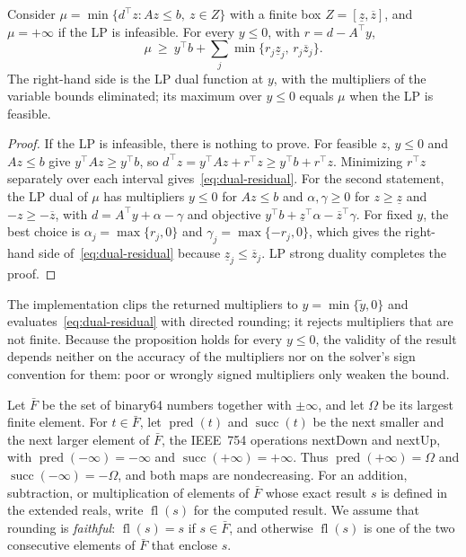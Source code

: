 \begin{proposition}\label{prop:dual-residual}
Consider $\mu=\min\{d^\top z:Az\le b,\ z\in Z\}$ with a finite box
$Z=[\underline z,\overline z]$, and $\mu=+\infty$ if the LP is infeasible.
For every $y\le0$, with $r=d-A^\top y$,
\begin{equation}\label{eq:dual-residual}
 \mu\ \ge\ y^\top b+\sum_j\min\{r_j\underline z_j,\,r_j\overline z_j\}.
\end{equation}
The right-hand side is the LP dual function at $y$, with the multipliers of
the variable bounds eliminated; its maximum over $y\le0$ equals $\mu$ when the
LP is feasible.
\end{proposition}

\begin{proof}
If the LP is infeasible, there is nothing to prove.
For feasible $z$, $y\le0$ and $Az\le b$ give $y^\top Az\ge y^\top b$, so
$d^\top z=y^\top Az+r^\top z\ge y^\top b+r^\top z$. Minimizing $r^\top z$
separately over each interval gives~\eqref{eq:dual-residual}. For the second
statement, the LP dual of $\mu$ has multipliers $y\le0$ for $Az\le b$ and
$\alpha,\gamma\ge0$ for $z\ge\underline z$ and $-z\ge-\overline z$, with
$d=A^\top y+\alpha-\gamma$ and objective
$y^\top b+\underline z^\top\alpha-\overline z^\top\gamma$. For fixed $y$,
the best choice is $\alpha_j=\max\{r_j,0\}$ and $\gamma_j=\max\{-r_j,0\}$, which
gives the right-hand side of~\eqref{eq:dual-residual} because
$\underline z_j\le\overline z_j$. LP strong duality completes the proof.
\end{proof}

The implementation clips the returned multipliers to $y=\min\{\tilde y,0\}$ and
evaluates~\eqref{eq:dual-residual} with directed rounding; it rejects
multipliers that are not finite. Because the proposition holds for every
$y\le0$, the validity of the result depends neither on the accuracy of the
multipliers nor on the solver's sign convention for them: poor or wrongly
signed multipliers only weaken the bound.

Let $\bar F$ be the set of binary64 numbers together with $\pm\infty$, and
let $\Omega$ be its largest finite element. For $t\in\bar F$, let
$\operatorname{pred}(t)$ and $\operatorname{succ}(t)$ be the next smaller and
the next larger element of $\bar F$, the IEEE~754 operations nextDown and
nextUp, with $\operatorname{pred}(-\infty)=-\infty$ and
$\operatorname{succ}(+\infty)=+\infty$. Thus
$\operatorname{pred}(+\infty)=\Omega$ and $\operatorname{succ}(-\infty)=-\Omega$,
and both maps are nondecreasing. For an addition, subtraction, or
multiplication of elements of $\bar F$ whose exact result $s$ is defined in
the extended reals, write $\operatorname{fl}(s)$ for the computed result. We
assume that rounding is \emph{faithful}: $\operatorname{fl}(s)=s$ if
$s\in\bar F$, and otherwise $\operatorname{fl}(s)$ is one of the two
consecutive elements of $\bar F$ that enclose $s$.

